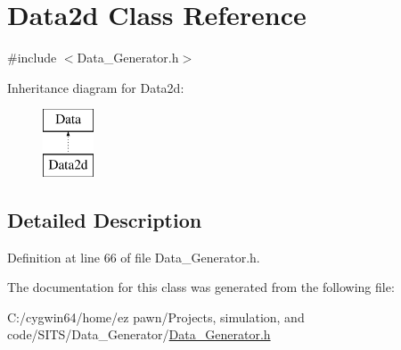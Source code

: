 \hypertarget{class_data2d}{}\section{Data2d Class Reference}
\label{class_data2d}


{\ttfamily \#include $<$Data\+\_\+\+Generator.\+h$>$}

Inheritance diagram for Data2d\+:\begin{figure}[H]
\begin{center}
\leavevmode
\includegraphics[height=2.000000cm]{class_data2d}
\end{center}
\end{figure}


\subsection{Detailed Description}


Definition at line 66 of file Data\+\_\+\+Generator.\+h.



The documentation for this class was generated from the following file\+:\begin{DoxyCompactItemize}
\item 
C\+:/cygwin64/home/ez pawn/\+Projects, simulation, and code/\+S\+I\+T\+S/\+Data\+\_\+\+Generator/\hyperlink{_data___generator_8h}{Data\+\_\+\+Generator.\+h}\end{DoxyCompactItemize}
